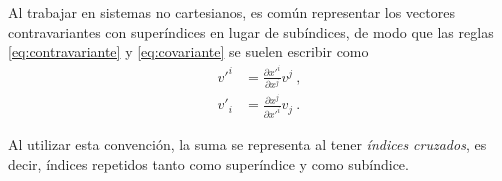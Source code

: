 Al trabajar en sistemas no cartesianos, es común representar los vectores contravariantes con superíndices en lugar de subíndices, de modo que las reglas \eqref{eq:contravariante} y \eqref{eq:covariante} se suelen escribir como
\begin{align*}
    v'^i & = \frac{\partial x'^{i}}{\partial x^j} v^j \ , \\
    v'_i & = \frac{\partial x^j}{\partial x'^{i}} v_j \ .
\end{align*}

Al utilizar esta convención, la suma se representa al tener \emph{índices cruzados}, es decir, índices repetidos tanto como superíndice y como subíndice.